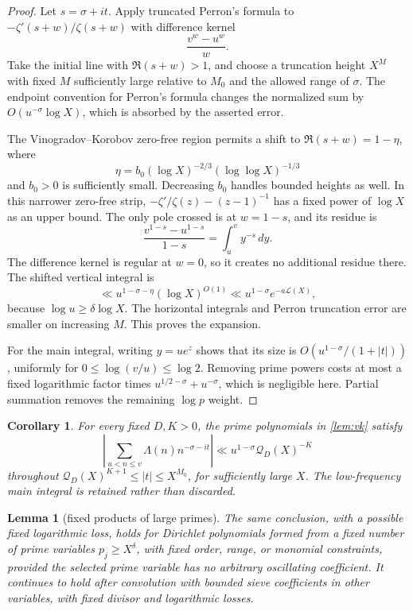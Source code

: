 \documentclass[11pt,a4paper]{article}
\newtheorem{lemma}[theorem]{Lemma}
\newtheorem{corollary}[theorem]{Corollary}
\theoremstyle{remark}
\newcommand{\Q}{\mathcal Q}
\newcommand{\LL}{\mathcal L}
\begin{document}
\begin{proof}
Let $s=\sigma+it$. Apply truncated Perron's formula to
$-\zeta'(s+w)/\zeta(s+w)$ with difference kernel
\[
                    \frac{v^w-u^w}{w}.
\]
Take the initial line with $\Re(s+w)>1$, and choose a truncation height
$X^M$ with fixed $M$ sufficiently large relative to $M_0$ and the allowed
range of $\sigma$.
The endpoint convention for Perron's formula changes the normalized
sum by $O(u^{-\sigma}\log X)$, which is absorbed by the asserted error.

The Vinogradov--Korobov zero-free region permits a shift to
$\Re(s+w)=1-\eta$, where
\[
 \eta=b_0(\log X)^{-2/3}(\log\log X)^{-1/3}
\]
and $b_0>0$ is sufficiently small. Decreasing $b_0$ handles bounded
heights as well. In this narrower zero-free strip,
$-\zeta'/\zeta(z)-(z-1)^{-1}$ has a fixed power of $\log X$ as an upper
bound. The only pole crossed is at $w=1-s$, and its residue is
\[
              \frac{v^{1-s}-u^{1-s}}{1-s}=\int_u^v y^{-s}\,dy.
\]
The difference kernel is regular at $w=0$, so it creates no additional
residue there. The shifted vertical integral is
\[
 \ll u^{1-\sigma-\eta}(\log X)^{O(1)}
 \ll u^{1-\sigma}e^{-a\LL(X)},
\]
because $\log u\ge\delta\log X$. The horizontal integrals and Perron
truncation error are smaller on increasing $M$.
This proves the expansion.

For the main integral, writing $y=ue^z$ shows that its size is
$O(u^{1-\sigma}/(1+|t|))$, uniformly for $0\le\log(v/u)\le\log2$.
Removing prime powers costs at most a fixed logarithmic factor times
$u^{1/2-\sigma}+u^{-\sigma}$, which is negligible here.
Partial summation removes the remaining $\log p$ weight.
\end{proof}

\begin{corollary}\label{cor:Qinput}
For every fixed $D,K>0$, the prime polynomials in \cref{lem:vk} satisfy
\[
 \left|\sum_{u<n\le v}\Lambda(n)n^{-\sigma-it}\right|
 \ll u^{1-\sigma}\Q_D(X)^{-K}
\]
throughout $\Q_D(X)^{K+1}\le |t|\le X^{M_0}$, for sufficiently large $X$.
The low-frequency main integral is retained rather than discarded.
\end{corollary}

\begin{lemma}[fixed products of large primes]\label{lem:products}
The same conclusion, with a possible fixed logarithmic loss, holds for
Dirichlet polynomials formed from a fixed number of prime variables
$p_j\ge X^\delta$, with fixed order, range, or monomial constraints,
provided the selected prime variable has no arbitrary oscillating
coefficient.
It continues to hold after convolution with bounded sieve coefficients
in other variables, with fixed divisor and logarithmic losses.
\end{lemma}
\end{document}
